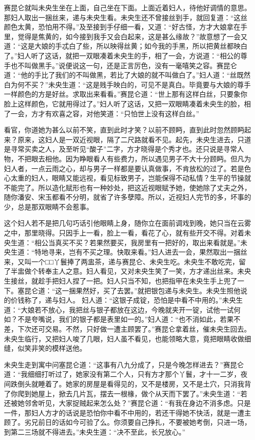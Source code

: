 \documentclass[a4paper,12pt,UTF8,twoside]{ctexbook}
\begin{document}
赛昆仑就叫未央生坐在上面，自己坐在下面。上面近着妇人，待他好调情的意思。那妇人取出一捆丝来，递与未央生看。未央生还不曾接丝到手，就回复道：“这丝颜色太黄，恐怕用不得。”及至接到手仔细一看，又道：“好古怪，方才大娘拿在手里，觉得是焦黄的，如今接到我手又会白起来，这是甚么缘故？”故意想了一会又道：“这是大娘的手忒白了些，所以映得丝黄；如今我的手黑，所以把黄丝都映白了。”妇人听了这话，就把一双眼凑着未央生的手，相了一会，方说道：“相公的尊手也不叫做黑手。”说便说这一句，还是正言厉色，没有一毫嘻笑之容。赛昆仑道：“他的手比了我们的不叫做黑，若比了大娘的就不叫做白了。”妇人道：“丝既然白为何不买？”未央生道：“这是贱手映白的，可见不是真白。毕竟要与大娘的尊手一样颜色的方是好丝。求取出来看看。”赛昆仑道：“世上那有这样白丝，只要象你脸上这样颜色，它就用得过了。”妇人听了这话，又把一双眼睛凑着未央生的脸，相了一会，方才有欢喜之容，对他笑道：“只怕世上没有这样白丝。”

看官，你道她为甚么以前不笑，直到此时才笑？以前不顾眄，直到此时忽然顾眄起来？原来，这妇人是一双近视眼，隔了二尺路就看不见。起先，未央生进去，只道是寻常买卖之人，及至听见“酸子”二字，方才晓得是个秀才也。还只说是寻常人物，不把眼去相他。因为睁眼看人有些费力，所以遇见男子不大十分顾眄。但凡为妇人者，一点云雨之心，却与男子一样都是要认真做事，不肯放松的过了。若是色心太重的妇人，眼睛又能远视，看见标致男子，岂能保得不动私情？生平的节操就不能完了。所以造化赋形也有一种妙处，把这近视眼赋予她，使她除了丈夫之外，随你潘安、宋玉都看不分明，就省了许多孽障。所以，近视妇人完节的多，坏事的少，总是那双眼睛不会惹事。

这个妇人若不是把几句巧话引他眼睛上身，随你立在面前调戏到晚，她只当在云雾之中，那里晓得。只因手上一看，脸上一看，看花了心，就有些开交不得。对着未央生道：“相公当真买不买？若果然要买，我房里有一把好的，取出来看就是。”未央生道：“特地寻来，岂有不买之理。快取来看。”妇人进去一会，果然取出一捆丝来，又叫一个□□丫鬟捧了两盅茶，递与赛昆仑、未央生吃。未央生不敢吃完，留了半盅做个转奉主人之意。妇人看见，又对未央生笑了一笑，方才递出丝来。未央生接丝，就趁手把妇人捏了一把。妇人只当不知，也把指甲在未央生手上兜了一下。塞昆仑道：“这一捆果然好，买了去罢。”就把银包递与未央生。未央生照他说的价钱称了，递与妇人。 妇人道：“这银子成锭，恐怕是中看不中用的。”未央生道：“大娘若不放心，我把丝与银子都放在这边，今晚就夹开一锭，试他一试何如？不是夸嘴说，我们的银子都是表里如一的。”妇人道：“也不消如此，若果不差，下次还可交易。不然，只好做一遭主顾罢了。”赛昆仑拿着丝，催未央生回去。未央生临行，又把妇人唆了几眼，妇人虽不看见，也能领略大意，竟把眼睛收做细缝，似笑非笑的模样送他。

未央生走到寓中问塞昆仑道：“这事有八九分成了，只是今晚怎样进去？”赛昆仑道：“我细细打听过了，她家没有第二个人，只有方才那个丫鬟，才十一二岁，夜间跌倒头就睡着了。她家的房屋是看得见的，又不是楼房，又不是土穴，只消我背了你爬到她屋上，掀去几片瓦，摆去一根椽，做个从天而下罢了。”未央生道：“若还被她邻舍听见，大家捉贼起来怎么处？”赛昆仑道：“有我在身边不消多虑。只是一件，那妇人方才的话说是恐怕你中看不中用的，若还干得她不快活，就是一遭主顾了。劣兄前日的话如今可验了么。你须要自己挣扎，不要被她考倒，只进一场，到第二三场就不得进去。”未央生道：“决不至此，长兄放心。”
\end{document}
